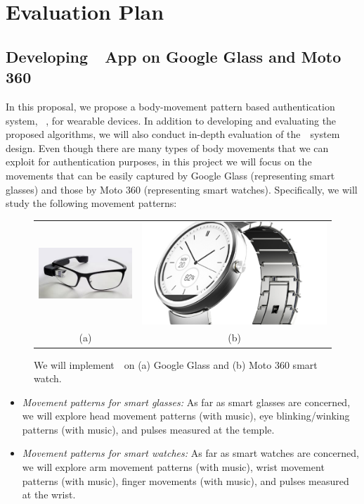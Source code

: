 \section{Evaluation Plan}\label{sec:eval} \vspace{-6pt}
\subsection{Developing~\systemname~App on Google Glass and Moto 360}\label{subsec:app}
In this proposal, we propose a body-movement pattern based authentication system, ~\systemname, for
wearable devices. In addition to developing and evaluating the proposed algorithms, we will also conduct in-depth evaluation of the~\systemname~system design. Even though there are many types of body movements that we can exploit for authentication purposes, in this project we will focus on the movements that can be easily captured by Google Glass (representing smart glasses) and those by Moto 360 (representing smart watches). Specifically, we will study the following movement patterns:
\begin{figure}\centering
\begin{tabular}{cc}
\includegraphics[width=0.45\linewidth]{../figure/glass1.jpg} &
\includegraphics[width=0.45\linewidth]{../figure/moto} \\
(a) & (b) \\
\end{tabular}
    \caption{\label{fig:devices} We will implement~\systemname~on (a) Google Glass and (b) Moto 360 smart watch.}
\vspace{-6pt}
\end{figure}
\begin{itemize}
\vspace{-2pt}\item \emph{Movement patterns for smart glasses:} As far as smart glasses are concerned, we will explore head movement patterns (with music), eye blinking/winking patterns (with music), and pulses measured at the temple.

\vspace{-2pt}\item \emph{Movement patterns for smart watches:} As far as smart watches are concerned, we will explore arm movement patterns (with music), wrist movement patterns (with music), finger movements (with music), and pulses measured at the wrist.
\end{itemize}

